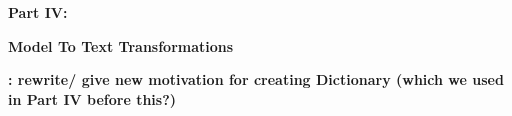 \vspace*{2cm}

{\bf \huge Part IV:}
\vspace{1cm}

{\bf \Huge Model To Text  Transformations }

{\bf : rewrite/ give new motivation for creating Dictionary (which we used in Part IV before this?)}






 







